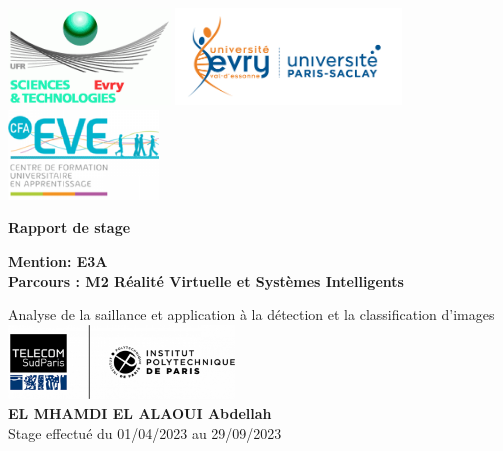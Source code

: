 \documentclass{report}
\begin{document}
\begin{titlepage}

	\begin{center}
		\includegraphics[width=4.3cm]{logo/ufr.png} %
		\hfill
		\includegraphics[width=6cm]{logo/ueve.png} %
		\hfill
		\includegraphics[width=4cm]{logo/cfa.png} %

		\vspace{3cm}
        \newcommand\titleofdoc{\bfseries Rapport de stage }
        \Huge{\titleofdoc} 

        \vspace{0.5cm}
        {\fontsize{14.4}{14.4}\textbf{ Mention: E3A}} \\      
        
        {\fontsize{14.4}{14.4}\textbf{Parcours : M2 Réalité Virtuelle et Systèmes Intelligents}}\\       

        \vspace{1 cm}

        \LARGE{ Analyse de la saillance et application à la détection et la classification d'images}\\
        \vspace{1 cm}
        {\includegraphics[width=0.45\textwidth]{logo/tsp.png}}\quad\\
        \vspace{2 cm}
        \vspace{0.25cm}
        {\bf {EL MHAMDI EL ALAOUI Abdellah}} \\
        Stage effectué du 01/04/2023 au 29/09/2023\\
        \vspace{3 cm}


\end{center}
\end{titlepage}
\end{document}
